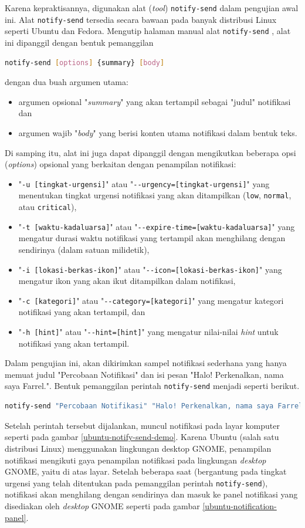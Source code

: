 Karena kepraktisannya, digunakan alat (\textit{tool}) \verb|notify-send| dalam pengujian awal ini. Alat \verb|notify-send| tersedia secara bawaan pada banyak distribusi Linux seperti Ubuntu dan Fedora. Mengutip halaman manual alat \verb|notify-send| \cite{notify-send-man-page}, alat ini dipanggil dengan bentuk pemanggilan
\begin{lstlisting}[language=bash]
    notify-send [options] {summary} [body]
\end{lstlisting}
dengan dua buah argumen utama:
\begin{itemize}
    \item argumen opsional "\textit{summary}" yang akan tertampil sebagai "judul" notifikasi dan
    \item argumen wajib "\textit{body}" yang berisi konten utama notifikasi dalam bentuk teks.
\end{itemize}
Di samping itu, alat ini juga dapat dipanggil dengan mengikutkan beberapa opsi (\textit{options}) opsional yang berkaitan dengan penampilan notifikasi:
\begin{itemize}
    \item "\verb|-u [tingkat-urgensi]|" atau "\verb|--urgency=[tingkat-urgensi]|" yang menentukan tingkat urgensi notifikasi yang akan ditampilkan (\verb|low|, \verb|normal|, atau \verb|critical|),
    \item "\verb|-t [waktu-kadaluarsa]|" atau "\verb|--expire-time=[waktu-kadaluarsa]|" yang mengatur durasi waktu notifikasi yang tertampil akan menghilang dengan sendirinya (dalam satuan milidetik),
    \item "\verb|-i [lokasi-berkas-ikon]|" atau "\verb|--icon=[lokasi-berkas-ikon]|" yang mengatur ikon yang akan ikut ditampilkan dalam notifikasi,
    \item "\verb|-c [kategori]|" atau "\verb|--category=[kategori]|" yang mengatur kategori notifikasi yang akan tertampil, dan
    \item "\verb|-h [hint]|" atau "\verb|--hint=[hint]|" yang mengatur nilai-nilai \textit{hint} untuk notifikasi yang akan tertampil.
\end{itemize}

Dalam pengujian ini, akan dikirimkan sampel notifikasi sederhana yang hanya memuat judul "Percobaan Notifikasi" dan isi pesan "Halo! Perkenalkan, nama saya Farrel.". Bentuk pemanggilan perintah \verb|notify-send| menjadi seperti berikut.
\begin{lstlisting}[language=bash]
    notify-send "Percobaan Notifikasi" "Halo! Perkenalkan, nama saya Farrel."
\end{lstlisting}
Setelah perintah tersebut dijalankan, muncul notifikasi pada layar komputer seperti pada gambar \ref{ubuntu-notify-send-demo}. Karena Ubuntu (salah satu distribusi Linux) menggunakan lingkungan desktop GNOME, penampilan notifikasi mengikuti gaya penampilan notifikasi pada lingkungan \textit{desktop} GNOME, yaitu di atas layar. Setelah beberapa saat (bergantung pada tingkat urgensi yang telah ditentukan pada pemanggilan perintah \verb|notify-send|), notifikasi akan menghilang dengan sendirinya dan masuk ke panel notifikasi yang disediakan oleh \textit{desktop} GNOME seperti pada gambar \ref{ubuntu-notification-panel}.


